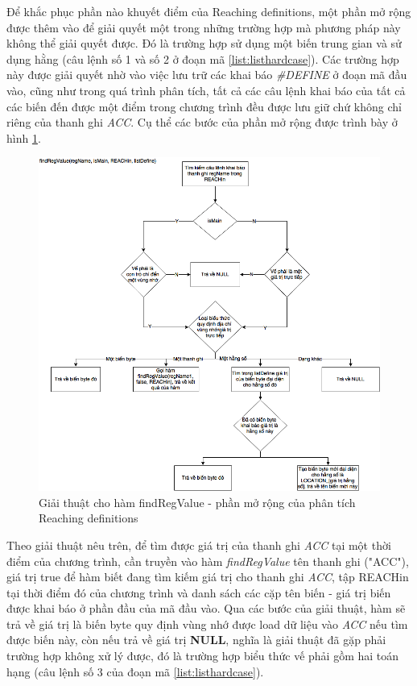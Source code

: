 Để khắc phục phần nào khuyết điểm của Reaching definitions, một phần mở rộng được thêm vào để giải quyết một trong những trường hợp mà phương pháp này không thể giải quyết được. Đó là trường hợp sử dụng một biến trung gian và sử dụng hằng (câu lệnh số 1 và số 2 ở đoạn mã \ref{list:listhardcase}). Các trường hợp này được giải quyết nhờ vào việc lưu trữ các khai báo \textit{\#DEFINE} ở đoạn mã đầu vào, cũng như trong quá trình phân tích, tất cả các câu lệnh khai báo của tất cả các biến đến được một điểm trong chương trình đều được lưu giữ chứ không chỉ riêng của thanh ghi \textit{ACC}. Cụ thể các bước của phần mở rộng được trình bày ở hình \ref{fig:reachdefextendalgo}.
\begin{figure}
	\centering
	\includegraphics[width=0.7\linewidth]{image/reachdefextendalgo}
	\caption{Giải thuật cho hàm findRegValue - phần mở rộng của phân tích Reaching definitions}
	\label{fig:reachdefextendalgo}
\end{figure}

Theo giải thuật nêu trên, để tìm được giá trị của thanh ghi \textit{ACC} tại một thời điểm của chương trình, cần truyền vào hàm \textit{findRegValue} tên thanh ghi ("ACC"), giá trị true để hàm biết đang tìm kiếm giá trị cho thanh ghi \textit{ACC}, tập REACHin tại thời điểm đó của chương trình và danh sách các cặp tên biến - giá trị biến được khai báo ở phần đầu của mã đầu vào. Qua các bước của giải thuật, hàm sẽ trả về giá trị là biến byte quy định vùng nhớ được load dữ liệu vào \textit{ACC} nếu tìm được biến này, còn nếu trả về giá trị \textbf{NULL}, nghĩa là giải thuật đã gặp phải trường hợp không xử lý được, đó là trường hợp biểu thức vế phải gồm hai toán hạng (câu lệnh số 3 của đoạn mã \ref{list:listhardcase}).


